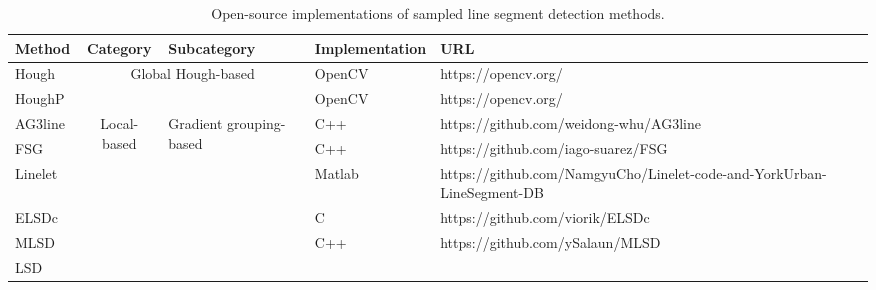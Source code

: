 \documentclass[journal,compsoc]{IEEEtran}
\begin{document}
\begin{table*}[tbp] 	
	\centering 	
	\scriptsize 	
	\caption{Open-source implementations of sampled line segment detection methods.} 	\begin{tabular}{|p{}<{\centering}|p{}<{\centering}|p{}<{\centering}|p{}<{\centering}|p{}<{\centering}|} 		
		\hline 		
		Method                                                                                                       & \multicolumn{1}{c|}{Category}                         & Subcategory                              & Implementation & URL                                                                    \\ \hline 		Hough                                                                                                        & \multicolumn{2}{c|}{\multirow{2}{*}{Global Hough-based}}                                                & OpenCV         & https://opencv.org/                                                    \\ \cline{1-1} \cline{4-5}  		HoughP \cite{RobustDetectionofLinesUsingtheProgressiveProbabilisticHoughTransform}          & \multicolumn{2}{c|}{}                                                                            & OpenCV         & https://opencv.org/                                                    \\ \hline 		AG3line \cite{AG3line}                                                                      & \multicolumn{1}{c|}{\multirow{12}{*}{Local-based}}    & \multirow{7}{*}{Gradient grouping-based} & C++            & https://github.com/weidong-whu/AG3line                                 \\ \cline{1-1} \cline{4-5}  		FSG \cite{FSG}                                                                              & \multicolumn{1}{c|}{}                                 &                                          & C++            & https://github.com/iago-suarez/FSG                                     \\ \cline{1-1} \cline{4-5}  		Linelet \cite{ANovelLineletBasedRepresentationforLineSegmentDetection}                      & \multicolumn{1}{c|}{}                                 &                                          & Matlab         & https://github.com/NamgyuCho/Linelet-code-and-YorkUrban-LineSegment-DB \\ \cline{1-1} \cline{4-5}  		ELSDc \cite{JointAContrarioEllipseandLineDetection}                                         & \multicolumn{1}{c|}{}                                 &                                          & C              & https://github.com/viorik/ELSDc                                        \\ \cline{1-1} \cline{4-5}  		MLSD \cite{MultiscalelinesegmentdetectorforrobustandaccurateSfM}                            & \multicolumn{1}{c|}{}                                 &                                          & C++            & https://github.com/ySalaun/MLSD                                        \\ \cline{1-1} \cline{4-5}  		LSD \cite{LSD,LSDaLineSegmentDetector}                        
\end{tabular}
\end{table*}
\end{document}
